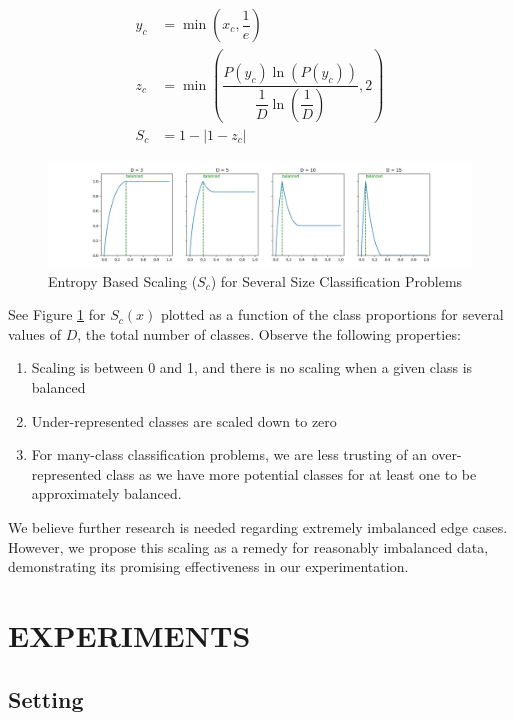 \documentclass{article} %
\begin{document}
\begin{align}
    y_c &= \min \left( x_c, \dfrac{1}{e} \right) \\
    z_c &= \min \left( \dfrac{P(y_c) \ln \left( P(y_c) \right)}{\dfrac{1}{D} \ln \left( \dfrac{1}{D} \right)}, 2 \right) \\
    S_c &= 1 - | 1 - z_c |    
\end{align}

\begin{figure}[H]
    \centering
    \includegraphics[width=\textwidth]{article/99_visuals/scaling.png}
    \caption{Entropy Based Scaling ($S_c$) for Several Size Classification Problems}
    \label{fig:scaling}
\end{figure}

See Figure \ref{fig:scaling} for $S_c(x)$ plotted as a function of the class proportions for several values of $D$, the total number of classes. Observe the following  properties:
\begin{enumerate}
    \item Scaling is between 0 and 1, and there is no scaling when a given class is balanced
    \item Under-represented classes are scaled down to zero
    \item For many-class classification problems, we are less trusting of an over-represented class as we have more potential classes for at least one to be approximately balanced.
\end{enumerate}

We believe further research is needed regarding extremely imbalanced edge cases. However, we propose this scaling as a remedy for reasonably imbalanced data, demonstrating its promising effectiveness in our experimentation.

\section{EXPERIMENTS}

%
\subsection{Setting}
\end{document}
